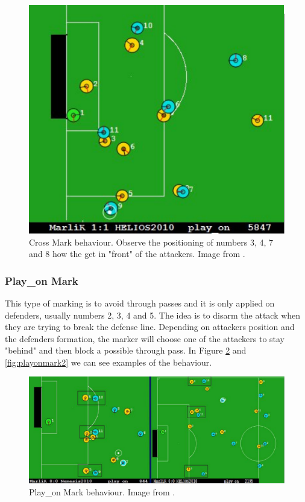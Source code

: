 \begin{figure}[H]
    \centering
    \includegraphics[scale=0.5]{images/cross_mark.png}
    \caption{Cross Mark behaviour. Observe the positioning of numbers 3, 4, 7 and 8 how the get in "front" of the attackers. Image from \cite{marlik2011}.}
    \label{fig:crossmark}
\end{figure}


\subsubsection{Play\_on Mark}
This type of marking is to avoid through passes and it is only applied on defenders, usually numbers 2, 3, 4 and 5. The idea is to disarm the attack when they are trying to break the defense line. Depending on attackers position and the defenders formation, the marker will choose one of the attackers to stay "behind" and then block a possible through pass. In Figure \ref{fig:playonmark} and \ref{fig:playonmark2} we can see examples of the behaviour.

\begin{figure}[H]
    \centering
    \includegraphics[scale=0.5]{images/play_on_mark.png}
    \caption{Play\_on Mark behaviour. Image from \cite{marlik2011}.}
    \label{fig:playonmark}
\end{figure}

